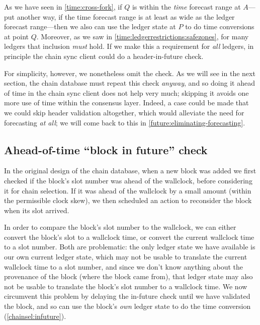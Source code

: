 \begin{center}
\end{center}

As we have seen in \cref{time:cross-fork}, if $Q$ is within the \emph{time}
forecast range at $A$---put another way, if the time forecast range is at least
as wide as the ledger forecast range---then we also can use the ledger state at
$P$ to do time conversions at point $Q$. Moreover, as we saw in
\cref{time:ledgerrestrictions:safezones}, for many ledgers that inclusion
\emph{must} hold. If we make this a requirement for \emph{all} ledgers, in
principle the chain sync client could do a header-in-future check.

For simplicity, however, we nonetheless omit the check. As we will see in the
next section, the chain database must repeat this check \emph{anyway}, and so
doing it ahead of time in the chain sync client does not help very much;
skipping it avoids one more use of time within the consensus layer. Indeed, a
case could be made that we could skip header validation altogether, which would
alleviate the need for forecasting \emph{at all}; we will come back to this in
\cref{future:eliminating-forecasting}.

\subsection{Ahead-of-time ``block in future'' check}
\label{time:block-infuture-check}

In the original design of the chain database, when a new block was added we
first checked if the block's slot number was ahead of the wallclock, before
considering it for chain selection. If it was ahead of the wallclock by a small
amount (within the permissible clock skew), we then scheduled an action to
reconsider the block when its slot arrived.

In order to compare the block's slot number to the wallclock, we can either
convert the block's slot to a wallclock time, or convert the current wallclock
time to a slot number. Both are problematic: the only ledger state we have
available is our own current ledger state, which may not be usable to translate
the current wallclock time to a slot number, and since we don't know anything
about the provenance of the block (where the block came from), that ledger state
may also not be usable to translate the block's slot number to a wallclock
time. We now circumvent this problem by delaying the in-future check until we
have validated the block, and so can use the block's \emph{own} ledger state to
do the time conversion (\cref{chainsel:infuture}).

